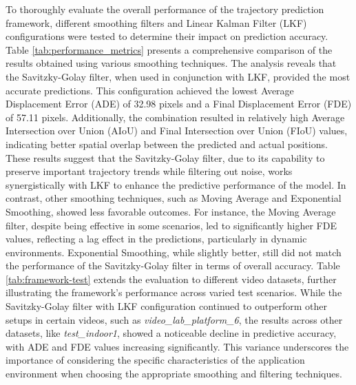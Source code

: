 \documentclass[12pt,oneside]{book} %
\begin{document}
To thoroughly evaluate the overall performance of the trajectory prediction
framework, different smoothing filters and Linear Kalman Filter (LKF)
configurations were tested to determine their impact on prediction accuracy.
Table \ref{tab:performance_metrics} presents a comprehensive comparison of the
results obtained using various smoothing techniques. The analysis reveals that
the Savitzky-Golay filter, when used in conjunction with LKF, provided the most
accurate predictions. This configuration achieved the lowest Average
Displacement Error (ADE) of 32.98 pixels and a Final Displacement Error (FDE)
of 57.11 pixels. Additionally, the combination resulted in relatively high
Average Intersection over Union (AIoU) and Final Intersection over Union (FIoU)
values, indicating better spatial overlap between the predicted and actual
positions. These results suggest that the Savitzky-Golay filter, due to its
capability to preserve important trajectory trends while filtering out noise,
works synergistically with LKF to enhance the predictive performance of the
model. In contrast, other smoothing techniques, such as Moving Average and
Exponential Smoothing, showed less favorable outcomes. For instance, the Moving
Average filter, despite being effective in some scenarios, led to significantly
higher FDE values, reflecting a lag effect in the predictions, particularly in
dynamic environments. Exponential Smoothing, while slightly better, still did
not match the performance of the Savitzky-Golay filter in terms of overall
accuracy. Table \ref{tab:framework-test} extends the evaluation to different
video datasets, further illustrating the framework’s performance across varied
test scenarios. While the Savitzky-Golay filter with LKF configuration
continued to outperform other setups in certain videos, such as
\textit{video\_lab\_platform\_6}, the results across other datasets, like
\textit{test\_indoor1}, showed a noticeable decline in predictive accuracy,
with ADE and FDE values increasing significantly. This variance underscores the
importance of considering the specific characteristics of the application
environment when choosing the appropriate smoothing and filtering techniques.
\end{document}
